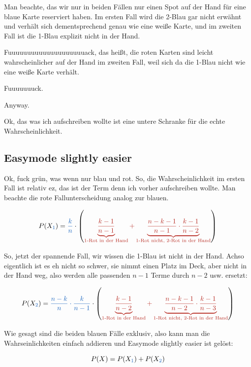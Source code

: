 \documentclass[../main.tex]{subfiles}
\begin{document}
Man beachte, das wir nur in beiden Fällen nur einen Spot auf der Hand für eine blaue Karte reserviert haben. Im ersten Fall wird die 2-Blau gar nicht erwähnt und verhält sich dementsprechend genau wie eine weiße Karte, und im zweiten Fall ist die 1-Blau explizit nicht in der Hand.

Fuuuuuuuuuuuuuuuuuuuuack, das heißt, die roten Karten sind leicht wahrscheinlicher auf der Hand im zweiten Fall, weil sich da die 1-Blau nicht wie eine weiße Karte verhält.

Fuuuuuuuck.

Anyway.

Ok, das was ich aufschreiben wollte ist eine untere Schranke für die echte Wahrscheinlichkeit.

\subsection{Easymode slightly easier}

Ok, fuck grün, was wenn nur blau und rot. So, die Wahrscheinlichkeit im ersten Fall ist relativ ez, das ist der Term denn ich vorher aufschreiben wollte. Man beachte die rote Fallunterscheidung analog zur blauen.

\begin{equation*}
    P(X_\blue 1) = \blue{\frac{k}{n}} \cdot \left (\red{\underbrace{\frac{k-1}{n-1}}_\text{1-Rot in der Hand} + \underbrace{\frac{n-k-1}{n-1} \cdot \frac{k-1}{n-2}}_\text{1-Rot nicht, 2-Rot in der Hand}}\right )
\end{equation*}

So, jetzt der spannende Fall, wir wissen die 1-Blau ist nicht in der Hand. Achso eigentlich ist es eh nicht so schwer, sie nimmt einen Platz im Deck, aber nicht in der Hand weg, also werden alle passenden $n-1$ Terme durch $n-2$ usw. ersetzt:

\begin{equation*}
    P(X_\blue 2) = \blue{\frac{n-k}{n}\cdot\frac{k}{n-1}} \cdot \left (\red{\underbrace{\frac{k-1}{n-2}}_\text{1-Rot in der Hand} + \underbrace{\frac{n-k-1}{n-2} \cdot \frac{k-1}{n-3}}_\text{1-Rot nicht, 2-Rot in der Hand}}\right )
\end{equation*}

Wie gesagt sind die beiden blauen Fälle exklusiv, also kann man die Wahrseinlichkeiten einfach addieren und Easymode slightly easier ist gelöst:

\begin{equation*}
    P(X) = P(X_\blue 1) + P(X_\blue 2)
\end{equation*}
\end{document}
